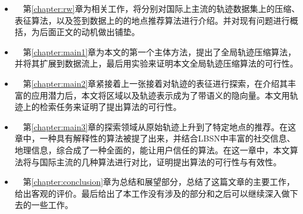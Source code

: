 \vspace{2mm}
\begin{itemize}
  \item ~~第\ref{chapter:rw}章为相关工作，将分别对国际上主流的轨迹数据集上的压缩、表征算法，以及签到数据上的的地点推荐算法进行介绍。并对现有问题进行概括，为后面正文的动机做出铺垫。
  \vspace{1mm}
  \item ~~第\ref{chapter:main1}章为本文的第一个主体方法，提出了全局轨迹压缩算法，并将其扩展到数据流上，最后用实验来证明本文全局轨迹压缩算法的可行性。
  \vspace{1mm}
  \item ~~第\ref{chapter:main2}章紧接着上一张接着对轨迹的表征进行探索，在介绍其丰富的应用潜力后，本文将区域以及轨迹表示成为了带语义的隐向量。本文用轨迹上的检索任务来证明了提出算法的可行性。
  \vspace{1mm}
  \item ~~第\ref{chapter:main3}章的探索领域从原始轨迹上升到了特定地点的推荐。在这章中，一种具有解释性的算法被提了出来，并结合LBSN中丰富的社交信息、地理信息，综合成了一种全面的，能让用户信任的算法。在这一章中，本文算法将与国际主流的几种算法进行对比，证明提出算法的可行性与有效性。
  \vspace{1mm}
  \item ~~第\ref{chapter:conclusion}章为总结和展望部分，总结了这篇文章的主要工作，给出客观的评价。最后给出了本工作没有涉及的部分和之后可以继续深入做下去的一些工作。
\end{itemize}

